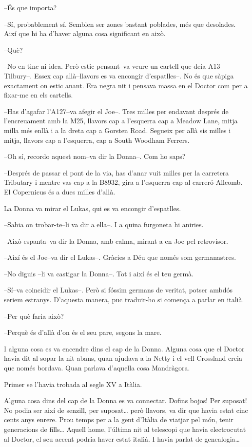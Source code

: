 --És que importa?

--Sí, probablement sí. Semblen ser zones bastant poblades, més que
desolades. Així que hi ha d'haver alguna cosa significant en això.

--Què?

--No en tinc ni idea. Però estic pensant--va veure un cartell que deia
A13 Tilbury--. Essex cap allà--llavors es va encongir d'espatlles--. No
és que sàpiga exactament on estic anant. Era negra nit i pensava massa
en el Doctor com per a fixar-me en els cartells.

--Has d'agafar l'A127--va afegir el Joe--. Tres milles per endavant
després de l'encreuament amb la M25, llavors cap a l'esquerra cap a
Meadow Lane, mitja milla més enllà i a la dreta cap a Gorsten Road.
Segueix per allà sis milles i mitja, llavors cap a l'esquerra, cap a
South Woodham Ferrers.

--Oh sí, recordo aquest nom--va dir la Donna--. Com ho saps?

--Després de passar el pont de la via, has d'anar vuit milles per la
carretera Tributary i mentre vas cap a la B8932, gira a l'esquerra cap
al carreró Allcomb. El Copernicus és a dues milles d'allà.

La Donna va mirar el Lukas, qui es va encongir d'espatlles.

--Sabia on trobar-te--li va dir a ella--. I a quina furgoneta hi
aniries.

--Això espanta--va dir la Donna, amb calma, mirant a en Joe pel
retrovisor.

--Així és el Joe--va dir el Lukas--. Gràcies a Déu que només som
germanastres.

--No diguis --li va castigar la Donna--. Tot i així és el teu germà.

--Sí--va coincidir el Lukas--. Però si fóssim germans de veritat, potser
ambdós seriem estranys. D'aquesta manera, puc traduir-ho si comença a
parlar en italià.

--Per què faria això?

--Perquè és d'allà d'on és el seu pare, segons la mare.

I alguna cosa es va encendre dins el cap de la Donna. Alguna cosa que el
Doctor havia dit al sopar la nit abans, quan ajudava a la Netty i el
vell Crossland creia que només bordava. Quan parlava d'aquella cosa
Mandràgora.

Primer se l'havia trobada al segle XV a Itàlia.

Alguna cosa dins del cap de la Donna es va connectar. Dofins bojos! Per
suposat! No podia ser així de senzill, per suposat\ldots{} però llavors,
va dir que havia estat cinc cents anys enrere. Prou temps per a la gent
d'Itàlia de viatjar pel món, tenir generacions de fills\ldots{} Aquell
home, l'última nit al telescopi que havia electrocutat al Doctor, el seu
accent podria haver estat italià. I havia parlat de genealogia\ldots{}


